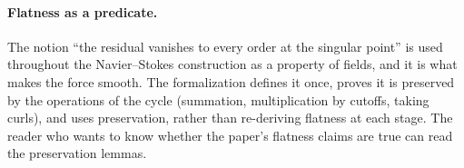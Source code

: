 \paragraph{Flatness as a predicate.} The notion ``the residual vanishes to every order at
the singular point'' is used throughout the Navier--Stokes construction as a property of
fields, and it is what makes the force smooth. The formalization defines it once, proves it
is preserved by the operations of the cycle (summation, multiplication by cutoffs, taking
curls), and uses preservation, rather than re-deriving flatness at each stage. The reader
who wants to know whether the paper's flatness claims are true can read the preservation
lemmas.
